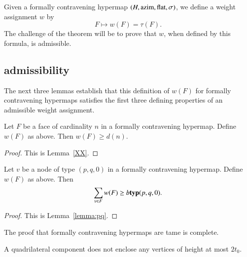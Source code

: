 Given a formally contravening hypermap $(H,{\operatorname{azim}},\operatorname{flat},\sigma)$, we
define a weight assignment $w$ by
    $$F \mapsto w(F) = \tau(F).$$
The challenge of the theorem will be to prove that $w$, when
defined by this formula, is admissible.

\subsection{admissibility}
\label{sec:admissibility}

The next three lemmas establish that this definition of $w(F)$ for
formally contravening hypermaps satisfies the first three defining
properties of an admissible weight assignment.

\begin{lemma}  Let $F$ be a face of cardinality $n$ in a formally contravening hypermap.
Define $w(F)$ as above. Then
        $w(F) \ge d(n)$.
\end{lemma}

\begin{proof} This is Lemma~\ref{XX}. %
\end{proof}

\begin{lemma} Let $v$ be a node of type $(p,q,0)$ in a
formally contravening hypermap.  Define $w(F)$ as above. Then
        $$\sum_{v\in F} w(F) \ge b{{\operatorname{\bf typ}}{(p,q,0)}}.$$
\end{lemma}


\begin{proof} This is Lemma~\ref{lemma:pq}.
\end{proof}



The proof that formally contravening hypermaps are tame is complete.




\begin{lemma}\label{lemma:enclosed:bis} %
A quadrilateral component does not enclose any vertices of height at
most $2t_0$.
\end{lemma}